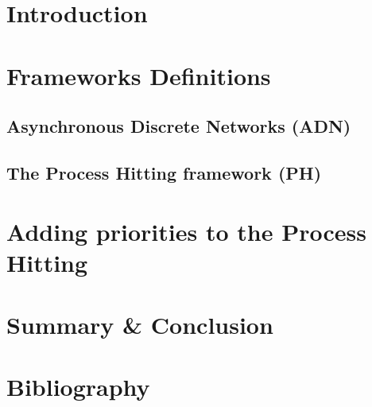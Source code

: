 \documentclass[fleqn,8pt,t]{beamer}
\begin{document}
\section{Introduction}


\section{Frameworks Definitions}
\subsection{Asynchronous Discrete Networks (ADN)}

\subsection{The Process Hitting framework (PH)}





\section{Adding priorities to the Process Hitting}




\section{Summary \& Conclusion}


\appendix
\section[x]{Bibliography}

%
\end{document}
